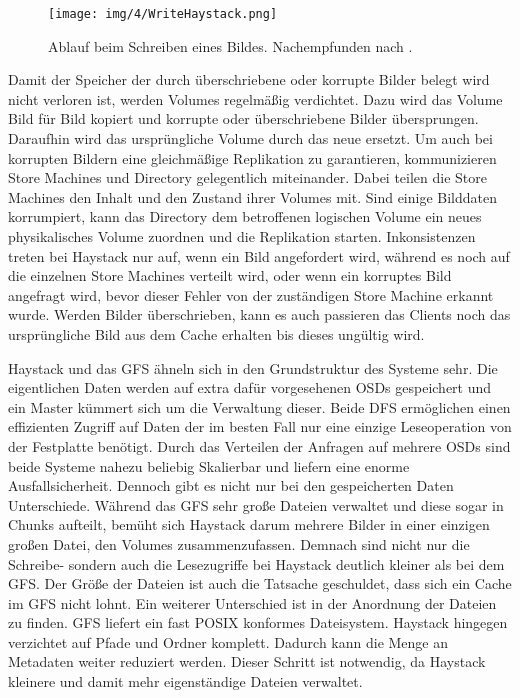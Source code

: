 \documentclass[12pt,oneside,a4paper,parskip]{scrbook}
\begin{document}
\begin{figure}[h]
  \centering
  \texttt{[image: img/4/WriteHaystack.png]}
  \caption[Ablauf beim Schreiben eines Bildes in Haystack.]{ Ablauf beim Schreiben eines Bildes. Nachempfunden nach \cite{haystack}.}
  \label{writeHaystack}
\end{figure}

Damit der Speicher der durch überschriebene oder korrupte Bilder belegt wird nicht verloren ist, werden Volumes regelmäßig verdichtet. Dazu wird das Volume Bild für Bild kopiert und korrupte oder überschriebene Bilder übersprungen. Daraufhin wird das ursprüngliche Volume durch das neue ersetzt. Um auch bei korrupten Bildern eine gleichmäßige Replikation zu garantieren, kommunizieren Store Machines und Directory gelegentlich miteinander. Dabei teilen die Store Machines den Inhalt und den Zustand ihrer Volumes mit. Sind einige Bilddaten korrumpiert, kann das Directory dem betroffenen logischen Volume ein neues physikalisches Volume zuordnen und die Replikation starten. Inkonsistenzen treten bei Haystack nur auf, wenn ein Bild angefordert wird, während es noch auf die einzelnen Store Machines verteilt wird, oder wenn ein korruptes Bild angefragt wird, bevor dieser Fehler von der zuständigen Store Machine erkannt wurde. Werden Bilder überschrieben, kann es auch passieren das Clients noch das ursprüngliche Bild aus dem Cache erhalten bis dieses ungültig wird.

Haystack und das GFS ähneln sich in den Grundstruktur des Systeme sehr. Die eigentlichen Daten werden auf extra dafür vorgesehenen OSDs gespeichert und ein Master kümmert sich um die Verwaltung dieser. Beide DFS ermöglichen einen effizienten Zugriff auf Daten der im besten Fall nur eine einzige Leseoperation von der Festplatte benötigt. Durch das Verteilen der Anfragen auf mehrere OSDs sind beide Systeme nahezu beliebig Skalierbar und liefern eine enorme Ausfallsicherheit. Dennoch gibt es nicht nur bei den gespeicherten Daten Unterschiede. Während das GFS sehr große Dateien verwaltet und diese sogar in Chunks aufteilt, bemüht sich Haystack darum mehrere Bilder in einer einzigen großen Datei, den Volumes zusammenzufassen. Demnach sind nicht nur die Schreibe- sondern auch die Lesezugriffe bei Haystack deutlich kleiner als bei dem GFS. Der Größe der Dateien ist auch die Tatsache geschuldet, dass sich ein Cache im GFS nicht lohnt. Ein weiterer Unterschied ist in der Anordnung der Dateien zu finden. GFS liefert ein fast POSIX konformes Dateisystem. Haystack hingegen verzichtet auf Pfade und Ordner komplett. Dadurch kann die Menge an Metadaten weiter reduziert werden. Dieser Schritt ist notwendig, da Haystack kleinere und damit mehr eigenständige Dateien verwaltet. 
\end{document}
